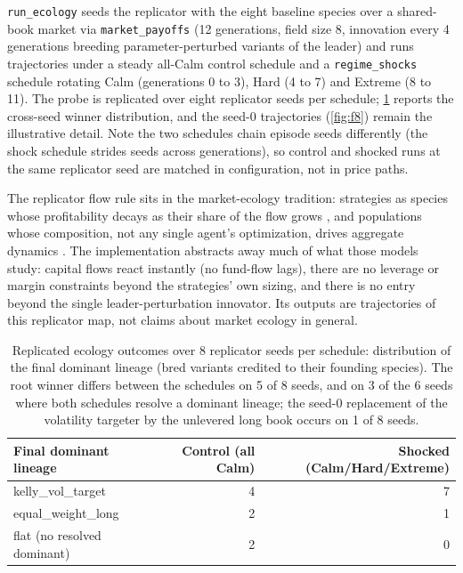 \texttt{run\_ecology} seeds the replicator with the eight baseline species over a shared-book market via \texttt{market\_payoffs} (12 generations, field size 8, innovation every 4 generations breeding parameter-perturbed variants of the leader) and runs trajectories under a steady all-Calm control schedule and a \texttt{regime\_shocks} schedule rotating Calm (generations 0 to 3), Hard (4 to 7) and Extreme (8 to 11). The probe is replicated over eight replicator seeds per schedule; \cref{tab:f8} reports the cross-seed winner distribution, and the seed-0 trajectories (\cref{fig:f8}) remain the illustrative detail. Note the two schedules chain episode seeds differently (the shock schedule strides seeds across generations), so control and shocked runs at the same replicator seed are matched in configuration, not in price paths.

The replicator flow rule sits in the market-ecology tradition: strategies as species whose profitability decays as their share of the flow grows \citep{farmer2002market}, and populations whose composition, not any single agent's optimization, drives aggregate dynamics \citep{lux1999scaling}. The implementation abstracts away much of what those models study: capital flows react instantly (no fund-flow lags), there are no leverage or margin constraints beyond the strategies' own sizing, and there is no entry beyond the single leader-perturbation innovator. Its outputs are trajectories of this replicator map, not claims about market ecology in general.

\begin{table}[t]
\centering
\caption{Replicated ecology outcomes over 8 replicator seeds per schedule: distribution of the final dominant lineage (bred variants credited to their founding species). The root winner differs between the schedules on 5 of 8 seeds, and on 3 of the 6 seeds where both schedules resolve a dominant lineage; the seed-0 replacement of the volatility targeter by the unlevered long book occurs on 1 of 8 seeds.}
\label{tab:f8}
\footnotesize
\setlength{\tabcolsep}{4pt}
\begin{tabular}{lrr}
\toprule
Final dominant lineage & Control (all Calm) & Shocked (Calm/Hard/Extreme) \\
\midrule
kelly\_vol\_target & 4 & 7 \\
equal\_weight\_long & 2 & 1 \\
flat (no resolved dominant) & 2 & 0 \\
\bottomrule
\end{tabular}
\end{table}

